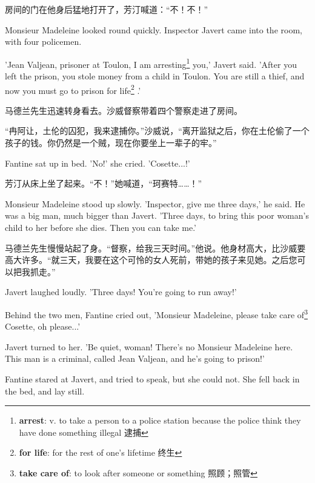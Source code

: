 \documentclass[fontset=ubuntu, zihao=5]{ctexart}
\begin{document}
\begin{paracol}{2}
  \switchcolumn

  房间的门在他身后猛地打开了，芳汀喊道：“不！不！”

  \switchcolumn*

  Monsieur Madeleine looked round quickly. Inspector Javert came into the room, with four policemen.


  'Jean Valjean, prisoner at Toulon, I am arresting\footnote{\textbf{arrest}:  v. to take a person to a police station because the police think they have done something illegal 逮捕}
  you,' Javert said. 'After you left the prison, you stole money from a child in Toulon. You are still a thief, and now you must go to prison for life\footnote{\textbf{for life}: for the rest of one's lifetime 终生}
  .'

  \switchcolumn

  马德兰先生迅速转身看去。沙威督察带着四个警察走进了房间。


  “冉阿让，土伦的囚犯，我来逮捕你。”沙威说，“离开监狱之后，你在土伦偷了一个孩子的钱。你仍然是一个贼，现在你要坐上一辈子的牢。”

  \switchcolumn*

  Fantine sat up in bed. 'No!' she cried. 'Cosette...!'

  \switchcolumn

  芳汀从床上坐了起来。“不！”她喊道，“珂赛特……！”

  \switchcolumn*

  Monsieur Madeleine stood up slowly. 'Inspector, give me three days,' he said. He was a big man, much bigger than Javert. 'Three days, to bring this poor woman's child to her before she dies. Then you can take me.'

  \switchcolumn

  马德兰先生慢慢站起了身。“督察，给我三天时间。”他说。他身材高大，比沙威要高大许多。“就三天，我要在这个可怜的女人死前，带她的孩子来见她。之后您可以把我抓走。”

  \switchcolumn*

  Javert laughed loudly. 'Three days! You're going to run away!'

  Behind the two men, Fantine cried out, 'Monsieur Madeleine, please take care of\footnote{\textbf{take care of}:  to look after someone or something 照顾；照管}
  Cosette, oh please...'

  Javert turned to her. 'Be quiet, woman! There's no Monsieur Madeleine here. This man is a criminal, called Jean Valjean, and he's going to prison!'

  Fantine stared at Javert, and tried to speak, but she could not. She fell back in the bed, and lay still.


\end{paracol}
\end{document}
